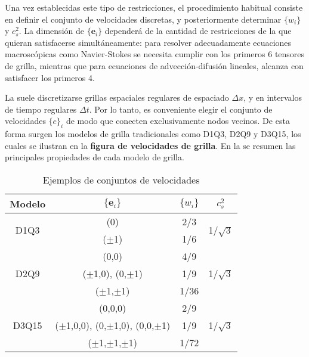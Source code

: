Una vez establecidas este tipo de restricciones, el procedimiento habitual consiste en definir el conjunto de velocidades discretas, y posteriormente determinar $\{w_i\}$ y $c_s^2$. La dimensi\'on de $\{ \bm{e}_i\}$ depender\'a de la cantidad de restricciones de la  que quieran satisfacerse simult\'aneamente: para resolver adecuadamente ecuaciones macrosc\'opicas como Navier-Stokes se necesita cumplir con los primeros 6 tensores de grilla, mientras que para ecuaciones de advecci\'on-difusi\'on lineales, alcanza con satisfacer los primeros 4.
\par
La  suele discretizarse grillas espaciales regulares de espaciado $\Delta x$, y en intervalos de tiempo regulares $\Delta t$. Por lo tanto, es conveniente elegir el conjunto de velocidades $\{e\}_i$ de modo que conecten exclusivamente nodos vecinos. De esta forma surgen los modelos de grilla tradicionales como D1Q3, D2Q9 y D3Q15, los cuales se ilustran en la \textbf{figura de velocidades de grilla}. En la  se resumen las principales propiedades de cada modelo de grilla.

\begin{table}[ht]
	\centering
    \begin{tabular}{c c c c}
	    \toprule
        \bf Modelo & $\{\bm{e}_i\}$ & $\{w_i\}$ & $c_s^2$ \\
        \midrule
        \multirow{2}{*}{D1Q3} & (0)      & 2/3 & \multirow{2}{*}{1/$\sqrt{3}$} \\
                              & ($\pm$1) & 1/6 &  \\                 
        \midrule
        \multirow{3}{*}{D2Q9} & (0,0) & 4/9 & \multirow{3}{*}{1/$\sqrt{3}$} \\
                              & ($\pm$1,0), (0,$\pm$1) & 1/9 &  \\
                              & ($\pm$1,$\pm$1) & 1/36 &  \\                              
        \midrule
        \multirow{3}{*}{D3Q15} & (0,0,0) & 2/9 & \multirow{3}{*}{1/$\sqrt{3}$} \\
                               & ($\pm$1,0,0), (0,$\pm$1,0), (0,0,$\pm$1) & 1/9 &  \\
                               & ($\pm$1,$\pm$1,$\pm$1) & 1/72 &  \\         
        \bottomrule
	\end{tabular}
	\caption{Ejemplos de conjuntos de velocidades}
	\label{tab:DdQq}
\end{table}  


